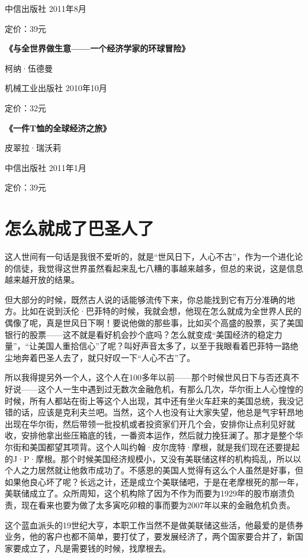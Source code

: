 中信出版社 2011年8月

定价：39元

\textbf{《与全世界做生意------一个经济学家的环球冒险》}

柯纳·伍德曼

机械工业出版社 2010年10月

定价：32元

\textbf{《一件T恤的全球经济之旅》}

皮翠拉·瑞沃莉

中信出版社 2011年1月

定价：39元

\section{怎么就成了巴圣人了}

这人世间有一句话是我很不爱听的，就是``世风日下，人心不古''，作为一个进化论的信徒，我觉得这世界虽然看起来乱七八糟的事越来越多，但总的来说，这是信息越来越开放的结果。

但大部分的时候，既然古人说的话能够流传下来，你总能找到它有万分准确的地方。比如在说到沃伦·巴菲特的时候，我就会想，他现在怎么就成为全世界人民的偶像了呢，真是世风日下啊！要说他做的那些事，比如买个高盛的股票，买了美国银行的股票------这不就是看好机会抄个底吗？怎么就变成``美国经济的稳定力量''，``让美国人重拾信心''了呢？叫好声音太多了，以至于我眼看着巴菲特一路绝尘地奔着巴圣人去了，就只好叹一下``人心不古''了。

所以我得提另外一个人，这个人在100多年以前------那个时候世风日下与否还真不好说------这个人一生中遇到过无数次金融危机，有那么几次，华尔街上人心惶惶的时候，所有人都站在街上等这个人出现，其中还有坐火车赶来的美国总统，我没记错的话，应该是克利夫兰吧。当然，这个人也没有让大家失望，他总是气宇轩昂地出现在华尔街，然后带领一批投机或者投资家们开几个会，安排你让点利见好就收，安排他拿出些压箱底的钱，一番资本运作，然后就力挽狂澜了。那才是整个华尔街和美国都望其项背。这个人叫约翰·皮尔庞特·摩根，就是我们现在还要提起的J·P·摩根。那个时候美国经济规模小，又没有美联储这样的机构捣乱，所以以个人之力居然就让他救市成功了。不感恩的美国人觉得有这么个人虽然是好事，但如果他良心坏了呢？长远之计，还是成立个美联储吧，于是在老摩根死的那一年，美联储成立了。众所周知，这个机构除了因为不作为而要为1929年的股市崩溃负责，现在看来也要为做了太多寅吃卯粮的事而要为2007年以来的金融危机负责。

这个蓝血派头的19世纪大亨，本职工作当然不是做美联储这些活，他最爱的是债券业务，他的客户也都不简单，要打仗了，要发展经济了，两个国家要合并了，新国家要成立了，凡是需要钱的时候，找摩根去。

